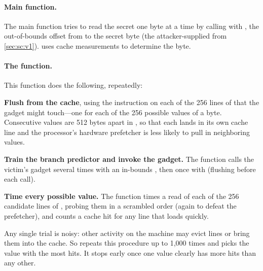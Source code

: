 \paragraph{Main function.}
The main function tries to read the secret one byte at a time by calling
 with , the out-of-bounds offset
from  to the secret byte (the attacker-supplied
 from \cref{sec:sc:v1}).
 uses cache measurements to determine the byte.

\paragraph{The  function.}
This function does the following, repeatedly:
\begin{compactenum}
  \item \textbf{Flush  from the cache}, using the
         instruction on each of the 256 lines of
         that the gadget might touch---one for each of the
        256 possible values of a byte.
        Consecutive values are 512 bytes apart in , so that
        each lands in its own cache line and the processor's hardware
        prefetcher is less likely to pull in neighboring values.
  \item \textbf{Train the branch predictor and invoke the gadget.}
        The function calls the victim's gadget several times with an
        in-bounds , then once with 
        (flushing  before each call).
  \item \textbf{Time every possible value.}
        The function times a read of each of the 256 candidate lines of
        , probing them in a scrambled order (again to defeat
        the prefetcher), and counts a cache hit for any line that loads
        quickly.
\end{compactenum}
Any single trial is noisy: other activity on the machine may evict lines
or bring them into the cache.
So  repeats this procedure up to 1,000 times and
picks the value with the most hits.
It stops early once one value clearly has more hits than any other.

